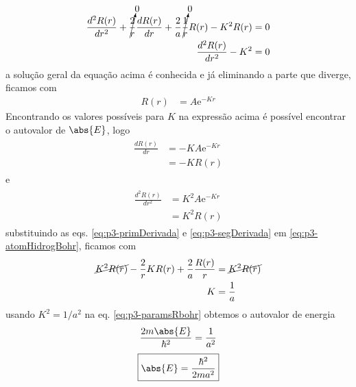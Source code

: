 \begin{prob}
\begin{sol}
\begin{enumerate}[label=\alph *)]
				 \begin{align}
					 \begin{split}
						 \frac{d^{2}R(r)}{dr^{2}}+\cancelto{0}{\frac{2}{r}}\frac{dR(r)}{dr}+\frac{2}{a}\cancelto{0}{\frac{1}{r}}R(r)-K^{2}R(r) &= 0\\
						 \frac{d^{2}R(r)}{dr^{2}}-K^{2} &= 0
					 \end{split}
				 \end{align}
				 a solução geral da equação acima é conhecida e já eliminando a parte que diverge, ficamos com
				 \begin{align}
					 \label{eq:p3-solRadial}
					 R(r) &= A \mathrm{e}^{-Kr}
				 \end{align}
				 Encontrando os valores possíveis para $K$ na expressão acima é possível encontrar o autovalor de $\abs{E}$, logo
				 \begin{align}
					 \label{eq:p3-primDerivada}
					 \begin{split}
						 \frac{dR(r)}{dr} &= -KA \mathrm{e}^{-Kr}\\
															&= -KR(r)
					 \end{split}
				 \end{align}
				 e
				 \begin{align}
					 \label{eq:p3-segDerivada}
					 \begin{split}
						 \frac{d^{2}R(r)}{dr^{2}} &= K^{2}A \mathrm{e}^{-Kr}\\
																			&= K^{2}R(r)
					 \end{split}	
				 \end{align}
				 substituindo as eqs. \eqref{eq:p3-primDerivada} e \eqref{eq:p3-segDerivada} em \eqref{eq:p3-atomHidrogBohr}, ficamos com
				 \begin{align}
					 \begin{split}
						 \cancel{K^{2}R(r)}-\frac{2}{r}KR(r)+\frac{2}{a}\frac{R(r)}{r} &= \cancel{K^{2}R(r)}\\
						 K &= \frac{1}{a}
					 \end{split}
				 \end{align}
				 usando $K^{2}=1/a^{2}$ na eq. \eqref{eq:p3-paramsRbohr} obtemos o autovalor de energia
				 \begin{align}
					 \frac{2m\abs{E}}{\hbar^{2}} &= \frac{1}{a^{2}}\\
				 \end{align}
				 \begin{align}
					 \boxed{
						 \abs{E}=\frac{\hbar^{2}}{2ma^{2}}
					 }
				 \end{align}

\end{enumerate}
\end{sol}
\end{prob}
